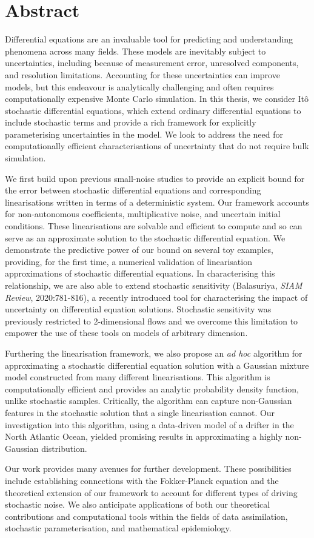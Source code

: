 \chapter{Abstract}
 {\small
  Differential equations are an invaluable tool for predicting and understanding phenomena across many fields.
  These models are inevitably subject to uncertainties, including because of measurement error, unresolved components, and resolution limitations.
  Accounting for these uncertainties can improve models, but this endeavour is analytically challenging and often requires computationally expensive Monte Carlo simulation.
  In this thesis, we consider It\^o stochastic differential equations, which extend ordinary differential equations to include stochastic terms and provide a rich framework for explicitly parameterising uncertainties in the model.
  We look to address the need for computationally efficient characterisations of uncertainty that do not require bulk simulation.

  We first build upon previous small-noise studies to provide an explicit bound for the error between stochastic differential equations and corresponding linearisations written in terms of a deterministic system.
  Our framework accounts for non-autonomous coefficients, multiplicative noise, and uncertain initial conditions.
  These linearisations are solvable and efficient to compute and so can serve as an approximate solution to the stochastic differential equation.
  We demonstrate the predictive power of our bound on several toy examples, providing, for the first time, a numerical validation of linearisation approximations of stochastic differential equations.
  In characterising this relationship, we are also able to extend stochastic sensitivity (Balasuriya, \emph{SIAM Review}, 2020:781-816), a recently introduced tool for characterising the impact of uncertainty on differential equation solutions.
  Stochastic sensitivity was previously restricted to 2-dimensional flows and we overcome this limitation to empower the use of these tools on models of arbitrary dimension.

  Furthering the linearisation framework, we also propose an \emph{ad hoc} algorithm for approximating a stochastic differential equation solution with a Gaussian mixture model constructed from many different linearisations.
  This algorithm is computationally efficient and provides an analytic probability density function, unlike stochastic samples.
  Critically, the algorithm can capture non-Gaussian features in the stochastic solution that a single linearisation cannot.
  Our investigation into this algorithm, using a data-driven model of a drifter in the North Atlantic Ocean, yielded promising results in approximating a highly non-Gaussian distribution.

  Our work provides many avenues for further development.
  These possibilities include establishing connections with the Fokker-Planck equation and the theoretical extension of our framework to account for different types of driving stochastic noise.
  We also anticipate applications of both our theoretical contributions and computational tools within the fields of data assimilation, stochastic parameterisation, and mathematical epidemiology.
 }
